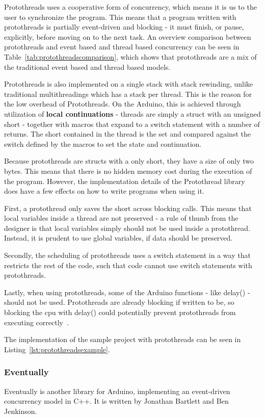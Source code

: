 Protothreads uses a cooperative form of concurrency, which means it is us to the user to synchronize the program. This means that a program written with protothreads is partially event-driven and blocking - it must finish, or pause, explicitly, before moving on to the next task. An overview comparison between protothreads and event based and thread based concurrency can be seen in Table~\ref{tab:protothreadscomparison}, which shows that protothreads are a mix of the traditional event based and thread based models.

Protothreads is also implemented on a single stack with stack rewinding, unlike traditional multithreadings which has a stack per thread. This is the reason for the low overhead of Protothreads. On the Arduino, this is achieved through utilization of \textbf{local continuations} - threads are simply a struct with an unsigned short - together with macros that expand to a switch statement with a number of returns. The short contained in the thread is the set and compared against the switch defined by the macros to set the state and continuation.

Because protothreads are structs with a only short, they have a size of only two bytes. This means that there is no hidden memory cost during the execution of the program. However, the implementation details of the Protothread library does have a few effects on how to write programs when using it.

First, a protothread only saves the short across blocking calls. This means that local variables inside a thread are not preserved - a rule of thumb from the designer is that local variables simply should not be used inside a protothread. Instead, it is prudent to use global variables, if data should be preserved.

Secondly, the scheduling of protothreads uses a switch statement in a way that restricts the rest of the code, such that code cannot use switch statements with protothreads.

Lastly, when using protothreads, some of the Arduino functions - like delay() - should not be used. Protothreads are already blocking if written to be, so blocking the cpu with delay() could potentially prevent protothreads from executing correctly~\cite{AdamDunkelProtothreads}.

The implementation of the sample project with protothreads can be seen in Listing~\ref{lst:protothreadsexample}.


\subsubsection{Eventually}
Eventually is another library for Arduino, implementing an event-driven concurrency model in C++. It is written by Jonathan Bartlett and Ben Jenkinson.


